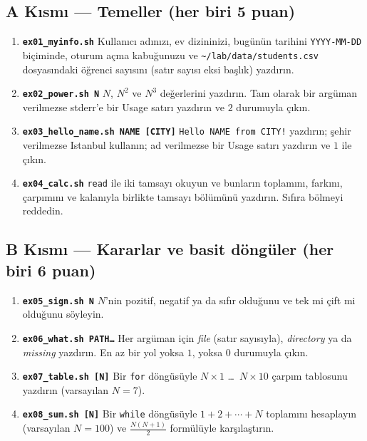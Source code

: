 \documentclass[11pt,a4paper]{article}
\begin{document}
\subsection*{A Kısmı --- Temeller (her biri 5 puan)}
\begin{enumerate}[leftmargin=1.6em]
  \item \textbf{\texttt{ex01\_myinfo.sh}} Kullanıcı adınızı, ev dizininizi, bugünün tarihini \texttt{YYYY-MM-DD} biçiminde, oturum açma kabuğunuzu ve \texttt{\textasciitilde/lab/data/students.csv} dosyasındaki öğrenci sayısını (satır sayısı eksi başlık) yazdırın.
  \item \textbf{\texttt{ex02\_power.sh N}} $N$, $N^2$ ve $N^3$ değerlerini yazdırın. Tam olarak bir argüman verilmezse stderr'e bir Usage satırı yazdırın ve $2$ durumuyla çıkın.
  \item \textbf{\texttt{ex03\_hello\_name.sh NAME [CITY]}} \texttt{Hello NAME from CITY!} yazdırın; şehir verilmezse Istanbul kullanın; ad verilmezse bir Usage satırı yazdırın ve $1$ ile çıkın.
  \item \textbf{\texttt{ex04\_calc.sh}} \texttt{read} ile iki tamsayı okuyun ve bunların toplamını, farkını, çarpımını ve kalanıyla birlikte tamsayı bölümünü yazdırın. Sıfıra bölmeyi reddedin.
\end{enumerate}

\subsection*{B Kısmı --- Kararlar ve basit döngüler (her biri 6 puan)}
\begin{enumerate}[leftmargin=1.6em,resume]
  \item \textbf{\texttt{ex05\_sign.sh N}} $N$'nin pozitif, negatif ya da sıfır olduğunu ve tek mi çift mi olduğunu söyleyin.
  \item \textbf{\texttt{ex06\_what.sh PATH\ldots}} Her argüman için \emph{file} (satır sayısıyla), \emph{directory} ya da \emph{missing} yazdırın. En az bir yol yoksa $1$, yoksa $0$ durumuyla çıkın.
  \item \textbf{\texttt{ex07\_table.sh [N]}} Bir \texttt{for} döngüsüyle $N \times 1$ \ldots\ $N \times 10$ çarpım tablosunu yazdırın (varsayılan $N = 7$).
  \item \textbf{\texttt{ex08\_sum.sh [N]}} Bir \texttt{while} döngüsüyle $1 + 2 + \cdots + N$ toplamını hesaplayın (varsayılan $N = 100$) ve $\frac{N(N+1)}{2}$ formülüyle karşılaştırın.
\end{enumerate}
\end{document}
